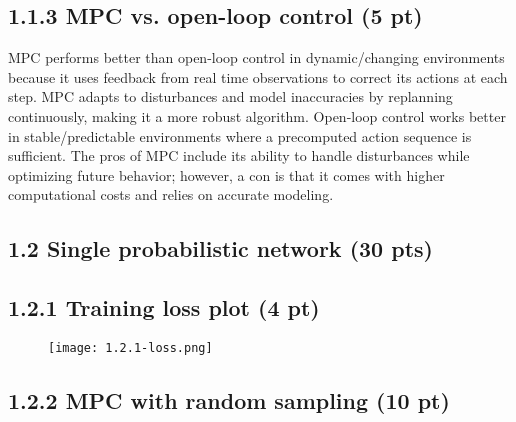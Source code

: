 \documentclass[12pt]{article}
\begin{document}
\subsection*{1.1.3 MPC vs. open-loop control (5 pt)}

\begin{tcolorbox}[fit,height=20em, width=40em, blank, borderline={1pt}{1pt},nobeforeafter, valign=center]
    \begin{center}
        MPC performs better than open-loop control in dynamic/changing environments because it uses feedback from real time observations to correct its actions at each step. MPC adapts to disturbances and model inaccuracies by replanning continuously, making it a more robust algorithm. Open-loop control works better in stable/predictable environments where a precomputed action sequence is sufficient. 
        \newline \newline
        The pros of MPC include its ability to handle disturbances while optimizing future behavior; however, a con is that it comes with higher computational costs and relies on accurate modeling.
    \end{center}
\end{tcolorbox}


\subsection*{1.2 Single probabilistic network (30 pts)}

\subsection*{1.2.1 Training loss plot (4 pt)}

\begin{tcolorbox}[fit,height=30em, width=40em, blank, borderline={1pt}{1pt},nobeforeafter]
\begin{center}
   
    \begin{figure}[H]
        \centering
        \texttt{[image: 1.2.1-loss.png]}
        \label{fig:placeholder}
    \end{figure}
\end{center}
\end{tcolorbox}

\subsection*{1.2.2 MPC with random sampling (10 pt)}
\end{document}
